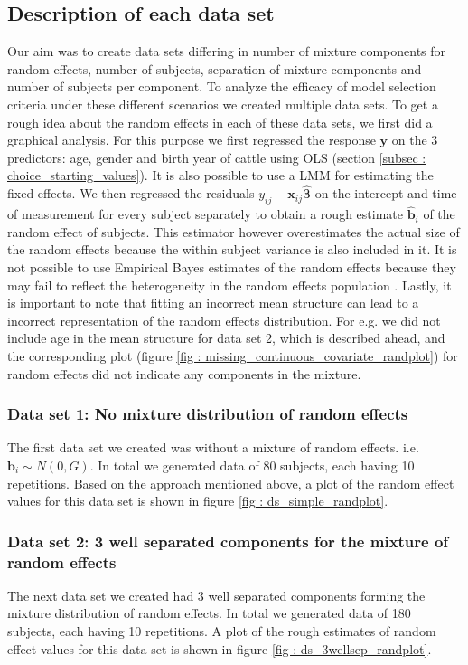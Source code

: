 \subsection{Description of each data set}
\label{subsec : ds_description}
Our aim was to create data sets differing in number of mixture components for random effects, number of subjects, separation of mixture components and number of subjects per component. To analyze the efficacy of model selection criteria under these different scenarios we created multiple data sets. To get a rough idea about the random effects in each of these data sets, we first did a graphical analysis. For this purpose we first regressed the response $\boldsymbol{y}$ on the 3 predictors: age, gender and birth year of cattle using OLS (section \ref{subsec : choice_starting_values}). It is also possible to use a LMM for estimating the fixed effects. We then regressed the residuals $y_{ij} - \boldsymbol{x}_{ij}\boldsymbol{\hat{\beta}}$ on the intercept and time of measurement for every subject separately to obtain a rough estimate $\boldsymbol{\hat{b}}_i$ of the random effect of subjects. This estimator however overestimates the actual size of the random effects because the within subject variance is also included in it. It is not possible to use Empirical Bayes estimates of the random effects because they may fail to reflect the heterogeneity in the random effects population \citep{verbeke_linear_1996}. Lastly, it is important to note that fitting an incorrect mean structure can lead to a incorrect representation of the random effects distribution. For e.g. we did not include age in the mean structure for data set 2, which is described ahead, and the corresponding plot (figure \ref{fig : missing_continuous_covariate_randplot}) for random effects did not indicate any components in the mixture. 

\subsubsection{Data set 1: No mixture distribution of random effects}
\label{subsubsec : ds_simple}
The first data set we created was without a mixture of random effects. i.e. $\boldsymbol{b}_i \sim N(0, G)$. In total we generated data of 80 subjects, each having 10 repetitions. Based on the approach mentioned above, a plot of the random effect values for this data set is shown in figure \ref{fig : ds_simple_randplot}.

\subsubsection{Data set 2: 3 well separated components for the mixture of random effects}
\label{subsubsec : ds_3wellsep}
The next data set we created had 3 well separated components forming the mixture distribution of random effects. In total we generated data of 180 subjects, each having 10 repetitions. A plot of the rough estimates of random effect values for this data set is shown in figure \ref{fig : ds_3wellsep_randplot}.

